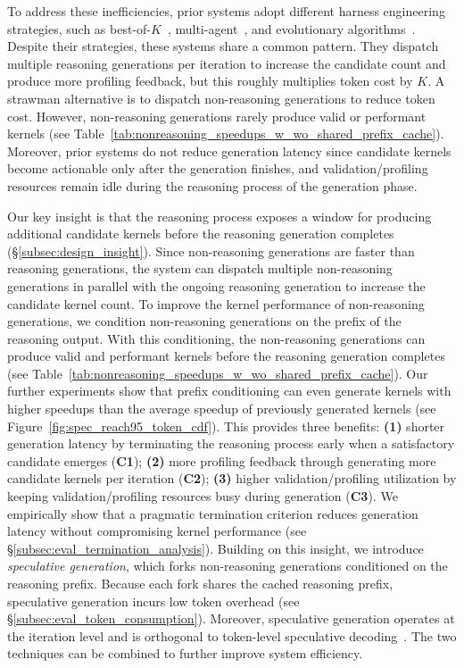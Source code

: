 To address these inefficiencies, prior systems adopt different harness engineering
strategies, such as best-of-$K$~\cite{cudaforge,K-Search}, multi-agent~\cite{kernelagent2025}, 
and evolutionary algorithms~\cite{AlphaEvolve,Kernel-Smith}.
Despite their strategies, these systems share a common pattern. 
They dispatch multiple reasoning generations per iteration to increase the
candidate count and produce more profiling feedback, but this roughly multiplies
token cost by $K$. 
A strawman alternative is to dispatch non-reasoning generations to reduce token cost. 
However, non-reasoning generations rarely produce valid or performant kernels (see Table~\ref{tab:nonreasoning_speedups_w_wo_shared_prefix_cache}).
Moreover, prior systems 
do not reduce generation latency since candidate kernels become actionable only after the 
generation finishes, and validation/profiling resources remain idle during the reasoning 
process of the generation phase.

Our key insight is that the reasoning process exposes a window for producing
additional candidate kernels before the reasoning generation completes
(\S\ref{subsec:design_insight}).
Since non-reasoning generations are faster than reasoning generations, the system can dispatch
multiple non-reasoning generations in parallel with the ongoing reasoning generation to 
increase the candidate kernel count.
To improve the kernel performance of non-reasoning generations, we condition non-reasoning
generations on the prefix of the reasoning output.
With this conditioning, the non-reasoning generations can produce valid and performant kernels before the
reasoning generation completes (see Table~\ref{tab:nonreasoning_speedups_w_wo_shared_prefix_cache}).
Our further experiments show that prefix conditioning can even generate kernels with higher speedups than 
the average speedup of previously generated kernels (see Figure~\ref{fig:spec_reach95_token_cdf}).
This provides three benefits:
\textbf{(1)} shorter generation latency by terminating the reasoning
process early when a satisfactory candidate emerges (\textbf{C1});
\textbf{(2)} more profiling feedback through generating more candidate kernels per
iteration (\textbf{C2});
\textbf{(3)} higher validation/profiling utilization by keeping validation/profiling
resources busy during generation (\textbf{C3}).
We empirically show that a pragmatic termination criterion reduces generation
latency without compromising kernel performance
(see \S\ref{subsec:eval_termination_analysis}).
Building on this insight, we introduce \emph{speculative generation}, which
forks non-reasoning generations conditioned on the reasoning prefix.
Because each fork shares the cached reasoning prefix, speculative generation
incurs low token overhead (see \S\ref{subsec:eval_token_consumption}).
Moreover, speculative generation operates at the iteration level and is
orthogonal to token-level speculative decoding~\cite{specdec,medusa}.
The two techniques can be combined to further improve system efficiency.

